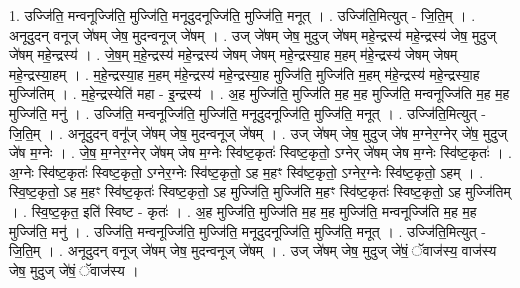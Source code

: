 \documentclass[17pt]{extarticle}
\begin{document}
1. उज्जि॑ति॒ मन्वनूज्जि॑ति॒ मुज्जि॑ति॒ मनूदुदनूज्जि॑ति॒ मुज्जि॑ति॒ मनूत् । . उज्जि॑ति॒मित्युत् - जि॒ति॒म् । . अनूदुदन् वनूज् जे॑षम् जेष॒ मुदन्वनूज् जे॑षम् । . उज् जे॑षम् जेष॒ मुदुज् जे॑षम् महे॒न्द्रस्य॑ महे॒न्द्रस्य॑ जेष॒ मुदुज् जे॑षम् महे॒न्द्रस्य॑ । . जे॒ष॒म् म॒हे॒न्द्रस्य॑ महे॒न्द्रस्य॑ जेषम् जेषम् महे॒न्द्रस्या॒ह म॒हम् म॑हे॒न्द्रस्य॑ जेषम् जेषम् महे॒न्द्रस्या॒हम् । . म॒हे॒न्द्रस्या॒ह म॒हम् म॑हे॒न्द्रस्य॑ महे॒न्द्रस्या॒ह मुज्जि॑ति॒ मुज्जि॑ति म॒हम् म॑हे॒न्द्रस्य॑ महे॒न्द्रस्या॒ह मुज्जि॑तिम् । . म॒हे॒न्द्रस्येति॑ महा - इ॒न्द्रस्य॑ । . अ॒ह मुज्जि॑ति॒ मुज्जि॑ति म॒ह म॒ह मुज्जि॑ति॒ मन्वनूज्जि॑ति म॒ह म॒ह मुज्जि॑ति॒ मनु॑ । . उज्जि॑ति॒ मन्वनूज्जि॑ति॒ मुज्जि॑ति॒ मनूदुदनूज्जि॑ति॒ मुज्जि॑ति॒ मनूत् । . उज्जि॑ति॒मित्युत् - जि॒ति॒म् । . अनूदुदन् वनू᳚ज् जे॑षम् जेष॒ मुदन्वनूज् जे॑षम् । . उज् जे॑षम् जेष॒ मुदुज् जे॑ष म॒ग्नेर॒ग्नेर् जे॑ष॒ मुदुज् जे॑ष म॒ग्नेः । . जे॒ष॒ म॒ग्नेर॒ग्नेर् जे॑षम् जेष म॒ग्नेः स्वि॑ष्ट॒कृतः॑ स्विष्ट॒कृतो॒ ऽग्नेर् जे॑षम् जेष म॒ग्नेः स्वि॑ष्ट॒कृतः॑ । . अ॒ग्नेः स्वि॑ष्ट॒कृतः॑ स्विष्ट॒कृतो॒ ऽग्नेर॒ग्नेः स्वि॑ष्ट॒कृतो॒ ऽह म॒हꣳ स्वि॑ष्ट॒कृतो॒ ऽग्नेर॒ग्नेः स्वि॑ष्ट॒कृतो॒ ऽहम् । . स्वि॒ष्ट॒कृतो॒ ऽह म॒हꣳ स्वि॑ष्ट॒कृतः॑ स्विष्ट॒कृतो॒ ऽह मुज्जि॑ति॒ मुज्जि॑ति म॒हꣳ स्वि॑ष्ट॒कृतः॑ स्विष्ट॒कृतो॒ ऽह मुज्जि॑तिम् । . स्वि॒ष्ट॒कृत॒ इति॑ स्विष्ट - कृतः॑ । . अ॒ह मुज्जि॑ति॒ मुज्जि॑ति म॒ह म॒ह मुज्जि॑ति॒ मन्वनूज्जि॑ति म॒ह म॒ह मुज्जि॑ति॒ मनु॑ । . उज्जि॑ति॒ मन्वनूज्जि॑ति॒ मुज्जि॑ति॒ मनूदुदनूज्जि॑ति॒ मुज्जि॑ति॒ मनूत् । . उज्जि॑ति॒मित्युत् - जि॒ति॒म् । . अनूदुदन् वनूज् जे॑षम् जेष॒ मुदन्वनूज् जे॑षम् । . उज् जे॑षम् जेष॒ मुदुज् जे॑षं॒ ॅवाज॑स्य॒ वाज॑स्य जेष॒ मुदुज् जे॑षं॒ ॅवाज॑स्य । \newline
\end{document}
